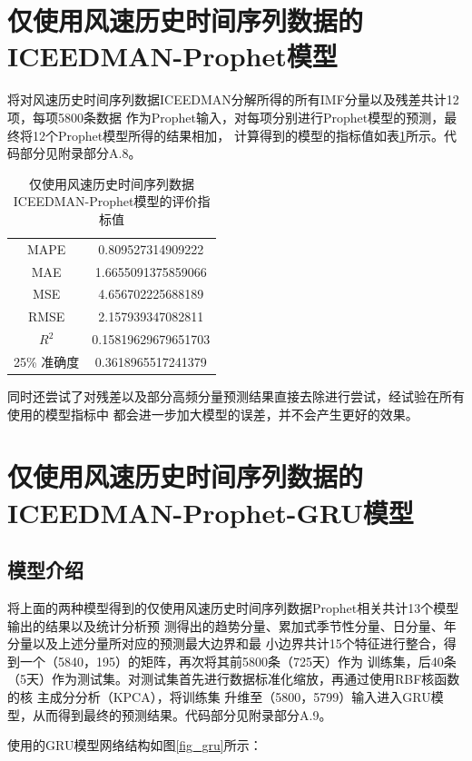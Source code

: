 \documentclass[AutoFakeBold]{LZUThesis}
\begin{document}
\section{仅使用风速历史时间序列数据的ICEEDMAN-Prophet模型}
将对风速历史时间序列数据ICEEDMAN分解所得的所有IMF分量以及残差共计12项，每项5800条数据
作为Prophet输入，对每项分别进行Prophet模型的预测，最终将12个Prophet模型所得的结果相加，
计算得到的模型的指标值如表\ref{wind_iceemdan_prophet_result}所示。代码部分见附录部分A.8。

\begin{table}[H]
    \centering
    \caption{仅使用风速历史时间序列数据ICEEDMAN-Prophet模型的评价指标值}
    \begin{tabular}{cc}
    \toprule
    MAPE & 0.809527314909222 \\
    MAE & 1.6655091375859066 \\
    MSE & 4.656702225688189 \\
    RMSE & 2.157939347082811 \\
    $R^2$ & 0.15819629679651703 \\
    25\% 准确度 & 0.3618965517241379 \\
    \bottomrule
    \end{tabular}
    \label{wind_iceemdan_prophet_result}
\end{table}

同时还尝试了对残差以及部分高频分量预测结果直接去除进行尝试，经试验在所有使用的模型指标中
都会进一步加大模型的误差，并不会产生更好的效果。

\section{仅使用风速历史时间序列数据的ICEEDMAN-Prophet-GRU模型}
\subsection{模型介绍}
将上面的两种模型得到的仅使用风速历史时间序列数据Prophet相关共计13个模型输出的结果以及统计分析预
测得出的趋势分量、累加式季节性分量、日分量、年分量以及上述分量所对应的预测最大边界和最
小边界共计15个特征进行整合，得到一个（5840，195）的矩阵，再次将其前5800条（725天）作为
训练集，后40条（5天）作为测试集。对测试集首先进行数据标准化缩放，再通过使用RBF核函数的核
主成分分析（KPCA），将训练集
升维至（5800，5799）输入进入GRU模型，从而得到最终的预测结果。代码部分见附录部分A.9。

使用的GRU模型网络结构如图\ref{fig_gru}所示：
\end{document}
